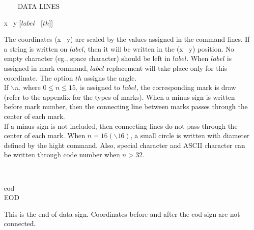 \begin{qsection}{\ ~~~DATA LINES}
\begin{minipage}[t]{5.5cm}
 x ~y [$label$~ [$th$]]
\end{minipage}
\begin{minipage}[t]{9cm}
The coordinates (x ~y) are scaled by the values assigned in the
command lines.
If a string is written on $label$, then it will be written
in the (x ~y) position.
No empty character (eg., space character) should be left in $label$.
When $label$ is assigned in mark command,
$label$ replacement will take place only for this coordinate.
The option $th$ assigns the angle.\\
If $\backslash n$, where $0 \leq n \leq 15$, is assigned to $label$,
the corresponding mark is draw (refer to the appendix for the types of
marks).
When a minus sign is written before mark number,
then the connecting line between marks passes through the center of
each mark.\\
If a minus sign is not included, then connecting lines do not pass
through the center of each mark.
When $n=16(\backslash 16)$, a small circle is written with
diameter defined by the hight command.
Also, special character and ASCII character can be written through
code number when $n>32$.
\end{minipage}\\

\begin{minipage}[t]{5.5cm}
 eod\\
EOD
\end{minipage}
\begin{minipage}[t]{9cm}
This is the end of data sign.
Coordinates before and after the eod sign are not connected.
\end{minipage}
\end{qsection}
\newpage

